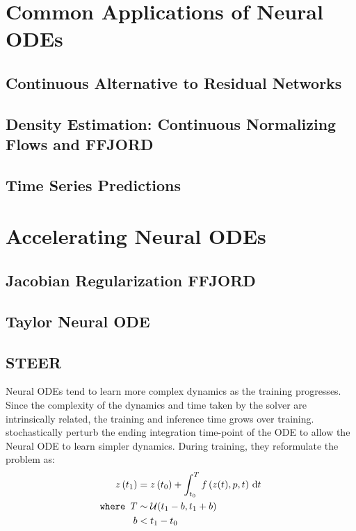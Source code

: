 \section{Common Applications of Neural ODEs}
\label{sec:neural_odes_applications}

\subsection{Continuous Alternative to Residual Networks}
\label{subsec:continuous_alternative_to_residual_networks}

\subsection{Density Estimation: Continuous Normalizing Flows and FFJORD}
\label{subsec:density_estimation_neural_odes}

\subsection{Time Series Predictions}
\label{subsec:time_series_predictions}

\section{Accelerating Neural ODEs}
\label{sec:accelerating_neural_odes_prior_works}

\subsection{Jacobian Regularization FFJORD}
\label{subsec:jacobian_regularization_ffjord}

\subsection{Taylor Neural ODE}
\label{subsec:taylor_neural_odes}



\subsection{STEER}
\label{subsec:steer}

Neural ODEs tend to learn more complex dynamics as the training progresses. Since the complexity of the dynamics and time taken by the solver are intrinsically related, the training and inference time grows over training. \citet{ghosh2020steer} stochastically perturb the ending integration time-point of the ODE to allow the Neural ODE to learn simpler dynamics. During training, they reformulate the problem as:
%
\begin{align}
  z\left(t_1\right)      & = z\left(t_0\right) + \int_{t_0}^{T} f\left(z(t), p, t\right) \, \mathrm{d}t \\
  \texttt{where } T  & \sim \mathcal{U}(t_1 - b, t_1 + b)                           \\
  \phantom{where } b & < t_1 - t_0
\end{align}
%

